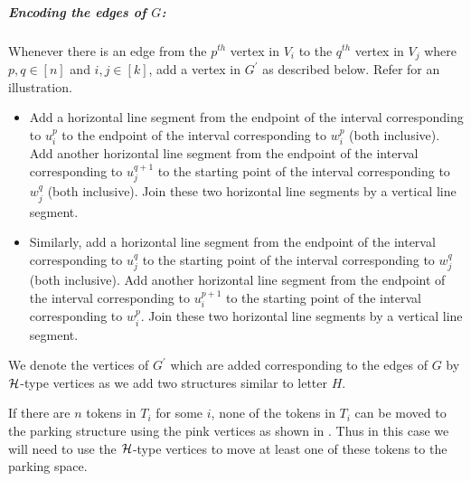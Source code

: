 \subparagraph*{Encoding the edges of $G$:}
Whenever there is an edge from the $p^{th}$ vertex in $V_i$ to the $q^{th}$ vertex in $V_j$ where $p,q\in[n]$ and $i,j\in [k]$, add a vertex in $G^\prime$ as described below. Refer  for an illustration.
\begin{itemize}
\item Add a horizontal line segment from the endpoint of the interval corresponding to $u_i^p$ to the endpoint of the interval corresponding to $w_i^p$ (both inclusive). Add another horizontal line segment from the endpoint of the interval corresponding to $u_j^{q+1}$ to the starting point of the interval corresponding to $w_j^q$ (both inclusive). Join these two horizontal line segments by a vertical line segment.
\item Similarly, add a horizontal line segment from the endpoint of the interval corresponding to $u_j^q$ to the starting point of the interval corresponding to $w_j^q$ (both inclusive). Add another horizontal line segment from the endpoint of the interval corresponding to $u_i^{p+1}$ to the starting point of the interval corresponding to $w_i^p$. Join these two horizontal line segments by a vertical line segment.
\end{itemize}
We denote the vertices of $G^\prime$ which are added corresponding to the edges of $G$ by ${\mathcal H}$-type vertices as we add two structures similar to letter $H$.

If there are $n$ tokens in $T_i$ for some $i$, none of the tokens in $T_i$
can be moved to the parking structure using the pink vertices as shown in 
 .
Thus in this case we will need to use the ${\mathcal H}$-type vertices to move at least one of these tokens to the parking space.

